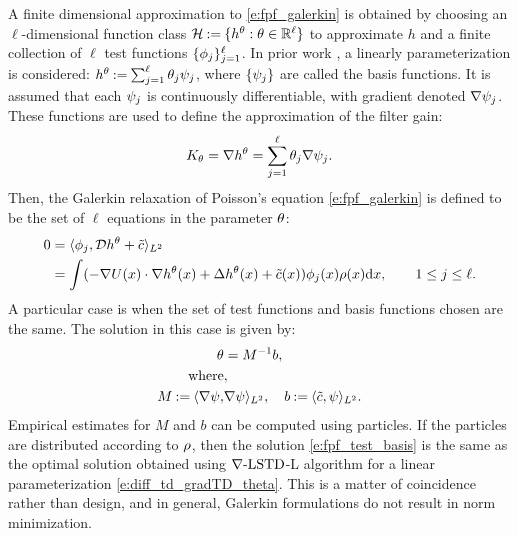 A finite dimensional approximation to \eqref{e:fpf_galerkin} is obtained by choosing an $\ell$-dimensional  function class
${\cal H}  \mathbin{:=} \{h^\theta : \theta \in \mathbb{R}^\ell\}$ to approximate $h$ and a finite collection of $\ell$ test functions $\{\phi_j\}_{j=1}^{\ell}$. In prior work \cite{yanmehmey13,yanlaumehmey16}, a linearly parameterization is considered: $h^\theta \mathbin{:=} \sum_{j=1}^{\ell}\theta_{j}\psi_{j} $, where $\{\psi_j\}$ are called the basis functions.  It is assumed that each $\psi_j$ is continuously differentiable,  with gradient denoted   $\nabla \psi_{j} $. These   functions are used to define the approximation of the filter gain:
\begin{equation}
K_\param = \nabla h^\param= \sum_{j=1}^{\ell}\param_{j}\gradbasis_{j}.
\label{e:fpf_basis_galerkin}
\end{equation}
Then, the Galerkin relaxation of Poisson's equation \eqref{e:fpf_galerkin} is defined to be the set of $\ell$ equations in the parameter $\theta$:
\begin{equation}
\begin{aligned}
0 &= \langle \test_{j}, \clD h^\param+\tilc \rangle_{L^2} \\
&= \int (-\nabla U(x) \cdot \nabla h^\param(x)+ \Delta h^\param(x)+\tilc (x))\test_{j}(x) \pr(x) \ud x,  \qquad  1\leq j \leq \ell.
\end{aligned}
\label{e:fpf_galerkin_be}
\end{equation}
A particular case is when the set of test functions and basis functions chosen are the same. The solution in this case is given by:
\begin{equation}
\begin{aligned}
\param & = M^{-1} b, \\
\text{where}&,\\ 
M \eqdef \langle \gradbasis, &\gradbasis \rangle_{L^2}, \quad b \eqdef \langle \tilc, \basis \rangle_{L^2}.
\label{e:fpf_test_basis}
\end{aligned}
\end{equation}
Empirical estimates for $M$ and $b$ can be computed using particles. If the particles are distributed according to $\rho$, then the solution \eqref{e:fpf_test_basis} is the same as the optimal solution obtained using $\nabla\text{-LSTD}$-L algorithm for a linear parameterization \eqref{e:diff_td_gradTD_theta}. This is a matter of coincidence rather than design, and in general, Galerkin formulations do not result in norm minimization. 

